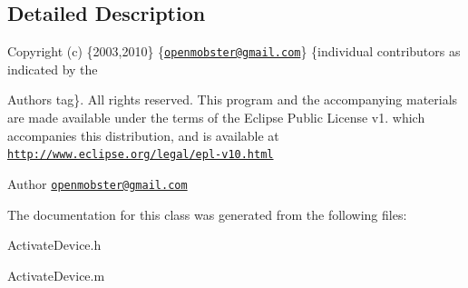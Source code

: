 \subsection{\-Detailed \-Description}
\-Copyright (c) \{2003,2010\} \{\href{mailto:openmobster@gmail.com}{\tt openmobster@gmail.\-com}\} \{individual contributors as indicated by the \begin{DoxyAuthor}{\-Authors}
tag\}. \-All rights reserved. \-This program and the accompanying materials are made available under the terms of the \-Eclipse \-Public \-License v1. which accompanies this distribution, and is available at \href{http://www.eclipse.org/legal/epl-v10.html}{\tt http\-://www.\-eclipse.\-org/legal/epl-\/v10.\-html}
\end{DoxyAuthor}
\begin{DoxyAuthor}{\-Author}
\href{mailto:openmobster@gmail.com}{\tt openmobster@gmail.\-com} 
\end{DoxyAuthor}


\-The documentation for this class was generated from the following files\-:\begin{DoxyCompactItemize}
\item 
\-Activate\-Device.\-h\item 
\-Activate\-Device.\-m\end{DoxyCompactItemize}
